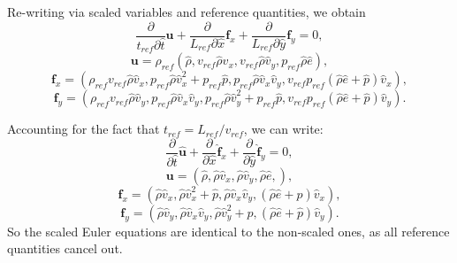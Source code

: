 \documentclass[a4paper,11pt,english]{article}
\begin{document}
Re-writing via scaled variables and reference quantities, we obtain
\begin{equation}
    \frac{\partial}{t_{ref}  \partial \hat{t}}\mathbf{u} + \frac{\partial}{L_{ref} \partial \hat{x}}\mathbf{f}_x + \frac{\partial}{L_{ref}\partial  \hat{y}}\mathbf{f}_y = 0,
\end{equation}
\begin{equation}
     \mathbf{u} = \rho_{ref}\left( \hat{\rho},
     v_{ref} \hat{\rho} \hat{v}_x,
     v_{ref} \hat{\rho} \hat{v}_y,
     p_{ref} \hat{\rho}\hat{e} \right),
\end{equation}
\begin{equation}
     \mathbf{f}_x = \left(\rho_{ref} v_{ref}  \hat{\rho} \hat{v}_x,
     p_{ref} \hat{\rho} \hat{v}_x^2 + p_{ref}\hat{p},
     p_{ref} \hat{\rho} \hat{v}_x \hat{v}_y,
     v_{ref}  p_{ref}(\hat{\rho}\hat{e}+\hat{p})\hat{v}_x \right),
\end{equation}
\begin{equation}
     \mathbf{f}_y = \left(\rho_{ref} v_{ref} \hat{\rho} \hat{v}_y,
     p_{ref} \hat{\rho} \hat{v}_x \hat{v}_y,
     p_{ref} \hat{\rho} \hat{v}_y^2 + p_{ref}\hat{p}, 
     v_{ref} p_{ref}(\hat{\rho}\hat{e}+\hat{p})\hat{v}_y \right).
\end{equation}

Accounting for the fact that $t_{ref}=L_{ref}/v_{ref}$, we can write:
\begin{equation}
    \frac{\partial}{\partial \hat{t}}\hat{\mathbf{u}} + \frac{\partial}{\partial \hat{x}}\hat{\mathbf{f}}_x + \frac{\partial}{\partial  \hat{y}}\hat{\mathbf{f}}_y = 0,
\end{equation}
\begin{equation}
     \mathbf{u} = \left(\hat{\rho},
     \hat{\rho} \hat{v}_x,
     \hat{\rho} \hat{v}_y,
     \hat{\rho}\hat{e},
     \right),
\end{equation}
\begin{equation}
     \mathbf{f}_x = \left(\hat{\rho} \hat{v}_x,
     \hat{\rho} \hat{v}_x^2 + \hat{p},
     \hat{\rho} \hat{v}_x \hat{v}_y,
     (\hat{\rho}\hat{e} + \hat{p})\hat{v}_x
     \right),
\end{equation}
\begin{equation}
     \mathbf{f}_y = \left(\hat{\rho} \hat{v}_y,
     \hat{\rho} \hat{v}_x \hat{v}_y,
     \hat{\rho} \hat{v}_y^2 + \hat{p}, 
     (\hat{\rho}\hat{e}+\hat{p})\hat{v}_y
     \right).
\end{equation}
So the scaled Euler equations are identical to the non-scaled ones, as all reference quantities cancel out.
\end{document}
